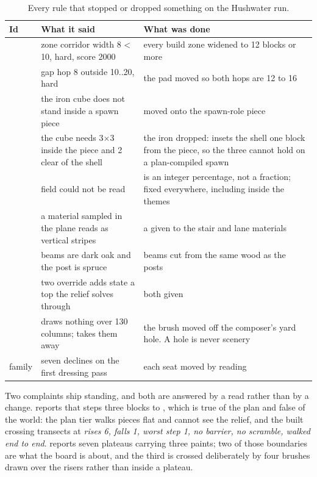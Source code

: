\begin{table}[htbp]
\caption{Every rule that stopped or dropped something on the Hushwater run.}
\label{tab:hushwater-refusals}
\small
\begin{tabularx}{\textwidth}{L{1.9cm} L{5.4cm} Y}
\toprule
\textbf{Id} & \textbf{What it said} & \textbf{What was done} \\
\midrule
{} & zone  corridor width 8 < 10, hard, score 2000 &
  every build zone widened to 12 blocks or more \\
 & gap hop 8 outside 10..20, hard &
  the pad moved so both hops are 12 to 16 \\
 & the iron cube does not stand inside a spawn piece &
  moved onto the spawn-role piece \\
 & the cube needs 3$\times$3 inside the piece and 2 clear of the shell &
  the iron dropped:  insets the shell one block from the piece, so the
  three cannot hold on a plan-compiled spawn \\
 & field  could not be read &
   is an integer percentage, not a fraction; fixed everywhere,
  including inside the themes \\
 & a material sampled in the plane reads as vertical stripes &
  a  given to the stair and lane materials \\
 & beams are dark oak and the post is spruce &
  beams cut from the same wood as the posts \\
 & two override adds state a top the relief solves through &
  both given  \\
 &  draws nothing over 130 columns; 
  takes them away &
  the brush moved off the composer's yard hole. A hole is never scenery \\
 family & seven declines on the first dressing pass &
  each seat moved by reading  \\
\bottomrule
\end{tabularx}
\end{table}

Two complaints ship standing, and both are answered by a read rather than by a
change.  reports that  steps three blocks to
, which is true of the plan and false of the world: the plan tier
walks pieces flat and cannot see the relief, and the built crossing transects at
\emph{rises 6, falls 1, worst step 1, no barrier, no scramble, walked end to
end}.  reports seven plateaus carrying three paints; two of those
boundaries are what the board is about, and the third is crossed deliberately by
four brushes drawn over the risers rather than inside a plateau.

